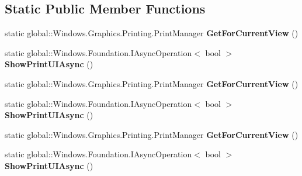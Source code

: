 \subsection*{Static Public Member Functions}
\begin{DoxyCompactItemize}
\item 
\mbox{\label{class_windows_1_1_graphics_1_1_printing_1_1_print_manager_abfe31189061a172a1ee117f46619d7d5}} 
static global\+::\+Windows.\+Graphics.\+Printing.\+Print\+Manager {\bfseries Get\+For\+Current\+View} ()
\item 
\mbox{\label{class_windows_1_1_graphics_1_1_printing_1_1_print_manager_a507fbd5a20b33954443017d1fa2ec1b0}} 
static global\+::\+Windows.\+Foundation.\+I\+Async\+Operation$<$ bool $>$ {\bfseries Show\+Print\+U\+I\+Async} ()
\item 
\mbox{\label{class_windows_1_1_graphics_1_1_printing_1_1_print_manager_abfe31189061a172a1ee117f46619d7d5}} 
static global\+::\+Windows.\+Graphics.\+Printing.\+Print\+Manager {\bfseries Get\+For\+Current\+View} ()
\item 
\mbox{\label{class_windows_1_1_graphics_1_1_printing_1_1_print_manager_a507fbd5a20b33954443017d1fa2ec1b0}} 
static global\+::\+Windows.\+Foundation.\+I\+Async\+Operation$<$ bool $>$ {\bfseries Show\+Print\+U\+I\+Async} ()
\item 
\mbox{\label{class_windows_1_1_graphics_1_1_printing_1_1_print_manager_abfe31189061a172a1ee117f46619d7d5}} 
static global\+::\+Windows.\+Graphics.\+Printing.\+Print\+Manager {\bfseries Get\+For\+Current\+View} ()
\item 
\mbox{\label{class_windows_1_1_graphics_1_1_printing_1_1_print_manager_a507fbd5a20b33954443017d1fa2ec1b0}} 
static global\+::\+Windows.\+Foundation.\+I\+Async\+Operation$<$ bool $>$ {\bfseries Show\+Print\+U\+I\+Async} ()
\item 
\mbox{\label{class_windows_1_1_graphics_1_1_printing_1_1_print_manager_abfe31189061a172a1ee117f46619d7d5}} 

\end{DoxyCompactItemize}

